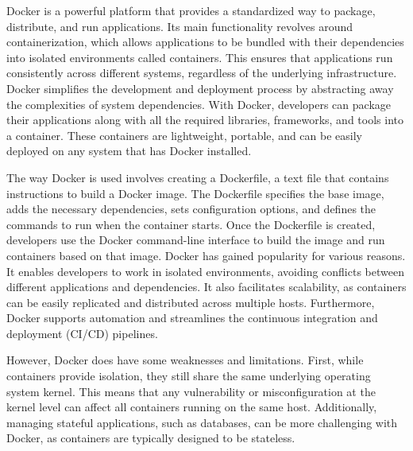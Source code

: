 \documentclass[a4paper, 11pt]{report}
\begin{document}
Docker is a powerful platform that provides a standardized way to package, distribute, and run applications. Its main functionality revolves around containerization, which allows applications to be bundled with their dependencies into isolated environments called containers. This ensures that applications run consistently across different systems, regardless of the underlying infrastructure. Docker simplifies the development and deployment process by abstracting away the complexities of system dependencies. With Docker, developers can package their applications along with all the required libraries, frameworks, and tools into a container. These containers are lightweight, portable, and can be easily deployed on any system that has Docker installed. 

The way Docker is used involves creating a Dockerfile, a text file that contains instructions to build a Docker image. The Dockerfile specifies the base image, adds the necessary dependencies, sets configuration options, and defines the commands to run when the container starts. Once the Dockerfile is created, developers use the Docker command-line interface to build the image and run containers based on that image. Docker has gained popularity for various reasons. It enables developers to work in isolated environments, avoiding conflicts between different applications and dependencies. It also facilitates scalability, as containers can be easily replicated and distributed across multiple hosts. Furthermore, Docker supports automation and streamlines the continuous integration and deployment (CI/CD) pipelines. 

However, Docker does have some weaknesses and limitations. First, while containers provide isolation, they still share the same underlying operating system kernel. This means that any vulnerability or misconfiguration at the kernel level can affect all containers running on the same host. Additionally, managing stateful applications, such as databases, can be more challenging with Docker, as containers are typically designed to be stateless. 
\end{document}
